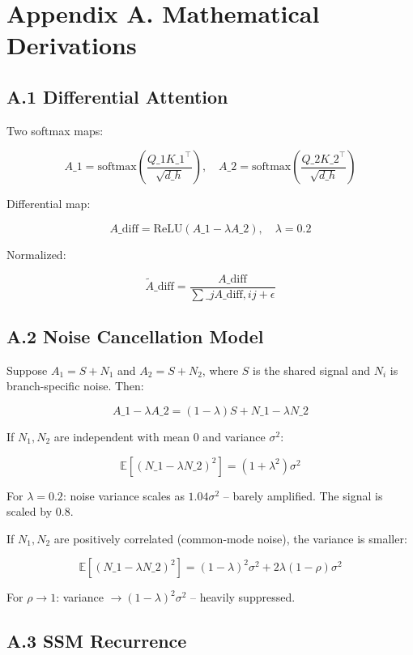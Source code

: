 \section{Appendix A. Mathematical Derivations}

\subsection{A.1 Differential Attention}

Two softmax maps:

\[
A\_1 = \text{softmax}\!\left(\frac{Q\_1 K\_1^\top}{\sqrt{d\_h}}\right), \quad
A\_2 = \text{softmax}\!\left(\frac{Q\_2 K\_2^\top}{\sqrt{d\_h}}\right)
\tag{A.1}
\]

Differential map:

\[
A\_\text{diff} = \text{ReLU}(A\_1 - \lambda A\_2), \quad \lambda = 0.2
\tag{A.2}
\]

Normalized:

\[
\tilde{A}\_\text{diff} = \frac{A\_\text{diff}}{\sum\_j A\_{\text{diff}, ij} + \epsilon}
\tag{A.3}
\]

\subsection{A.2 Noise Cancellation Model}

Suppose $A_1 = S + N_1$ and $A_2 = S + N_2$, where $S$ is the shared 
signal and $N_i$ is branch-specific noise. Then:

\[
A\_1 - \lambda A\_2 = (1 - \lambda) S + N\_1 - \lambda N\_2
\tag{A.4}
\]

If $N_1, N_2$ are independent with mean 0 and variance $\sigma^2$:

\[
\mathbb{E}[(N\_1 - \lambda N\_2)^2] = (1 + \lambda^2) \sigma^2
\tag{A.5}
\]

For $\lambda = 0.2$: noise variance scales as $1.04 \sigma^2$ -- barely 
amplified. The signal is scaled by $0.8$.

If $N_1, N_2$ are positively correlated (common-mode noise), the variance 
is smaller:

\[
\mathbb{E}[(N\_1 - \lambda N\_2)^2] = (1 - \lambda)^2 \sigma^2 + 2\lambda(1 - \rho) \sigma^2
\tag{A.6}
\]

For $\rho \to 1$: variance $\to (1 - \lambda)^2 \sigma^2$ -- heavily 
suppressed.

\subsection{A.3 SSM Recurrence}

